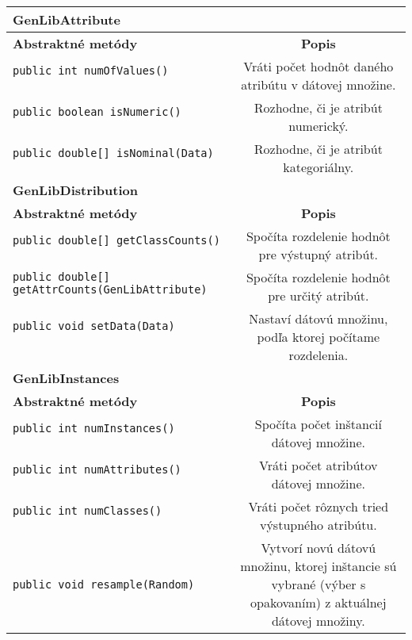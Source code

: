 \begin{table}
\centering
\begin{tabular}{|l|c|}
\hline
\textbf{GenLibAttribute} & \\
\hline\hline
\textbf{Abstraktné metódy} & \textbf{Popis} \\
\hline
\verb|public int numOfValues()| & \multirow{2}{5cm}{Vráti počet hodnôt daného atribútu v dátovej množine.} \\
& \\
\hline
\verb|public boolean isNumeric()| & \multirow{2}{5cm}{Rozhodne, či je atribút numerický.} \\
& \\
\hline
\verb|public double[] isNominal(Data)| & \multirow{2}{5cm}{Rozhodne, či je atribút kategoriálny.} \\
& \\  
\hline
\hline
\textbf{GenLibDistribution} & \\
\hline\hline
\textbf{Abstraktné metódy} & \textbf{Popis} \\
\hline
\verb|public double[] getClassCounts()| & \multirow{2}{5cm}{Spočíta rozdelenie hodnôt pre výstupný atribút.} \\
& \\
\hline
\verb|public double[] getAttrCounts(GenLibAttribute)| & \multirow{2}{5cm}{Spočíta rozdelenie hodnôt pre určitý atribút.} \\
& \\ 
\hline
\verb|public void setData(Data)| & \multirow{3}{5cm}{Nastaví dátovú množinu, podľa ktorej počítame rozdelenia.} \\
& \\ 
& \\ 
\hline
\hline
\textbf{GenLibInstances} & \\
\hline\hline
\textbf{Abstraktné metódy} & \textbf{Popis} \\
\hline
\verb|public int numInstances()| & \multirow{2}{5cm}{Spočíta počet inštancií dátovej množine.} \\
& \\
\hline
\verb|public int numAttributes()| & \multirow{2}{5cm}{Vráti počet atribútov dátovej množine.} \\
& \\ 
\hline
\verb|public int numClasses()| & \multirow{2}{5cm}{Vráti počet rôznych tried výstupného atribútu.} \\
& \\ 
\hline
\verb|public void resample(Random)| & \multirow{5}{5cm}{Vytvorí novú dátovú množinu, ktorej inštancie sú vybrané (výber s opakovaním) z aktuálnej dátovej množiny.} \\

\end{tabular}
\end{table}
